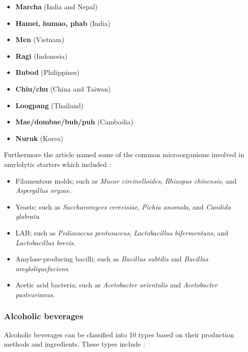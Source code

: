 \begin{highlight}
    \begin{itemize}
        \item \textbf{Marcha} (India and Nepal)
        \item \textbf{Hamei, humao, phab} (India)
        \item \textbf{Men} (Vietnam)
        \item \textbf{Ragi} (Indonesia)
        \item \textbf{Bubod} (Philippines)
        \item \textbf{Chiu/chu} (China and Taiwan)
        \item \textbf{Loogpang} (Thailand)
        \item \textbf{Mae/dombae/buh/puh} (Cambodia)
        \item \textbf{Nuruk} (Korea)
    \end{itemize}
\end{highlight}


Furthermore the article named some of the common microorganisms involved in amylolytic starters which included \cite*{L1-DiversityMicro}:

\begin{highlight}
    \begin{itemize}
        \item Filamentous molds; such as \textit{Mucor circinelloides}, \textit{Rhizopus chinensis}, and \textit{Aspergillus oryzae}.
        \item Yeasts; such as \textit{Saccharomyces cerevisiae}, \textit{Pichia anomala}, and \textit{Candida glabrata}.
        \item LAB; such as \textit{Pediococcus pentosaceus}, \textit{Lactobacillus bifermentans}, and \textit{Lactobacillus brevis}.
        \item Amylase-producing bacilli; such as \textit{Bacillus subtilis} and \textit{Bacillus amyloliquefaciens}.
        \item Acetic acid bacteria; such as \textit{Acetobacter orientalis} and \textit{Acetobacter pasteurianus}.
    \end{itemize}
\end{highlight}

\subsubsection*{Alcoholic beverages}
Alcoholic beverages can be classified into 10 types based on their production methods and ingredients. These types include \cite*{L1-DiversityMicro}:

